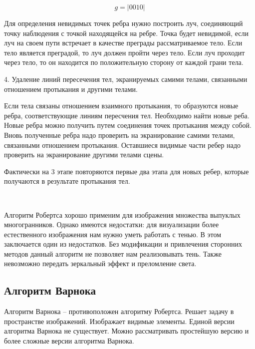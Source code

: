 \begin{equation}
	g = |0010|
	\label{eq:ref3}
\end{equation}

Для определения невидимых точек ребра нужно построить луч, соединяющий точку наблюдения с точкой находящейся на ребре.
Точка будет невидимой, если луч на своем пути встречает в качестве преграды рассматриваемое тело.
Если тело является преградой, то луч должен пройти через тело.
Если луч проходит через тело, то он находится по положительную сторону от каждой грани тела.

4. Удаление линий пересечения тел, экранируемых самими телами, связанными отношением протыкания и другими телами.

Если тела связаны отношением взаимного протыкания, то образуются новые ребра, соответствующие линиям пересчения тел. Необходимо найти новые реба. Новые ребра можно получить путем соединения точек протыкания между собой. Вновь полученные ребра надо проверить на экранирование самими телами, связанными отношением протыкания. Оставшиеся видимые части ребер надо проверить на экранирование другими телами сцены.

Фактически на 3 этапе повторяются первые два этапа для новых ребер, которые получаются в результате протыкания тел.

~

Алгоритм Робертса хорошо применим для изображения множества выпуклых многогранников. Однако имеются недостатки: для визуализации более естественного изображения нам нужно уметь работать с тенью. В этом заключается один из недостатков. Без модификации и привлечения сторонних методов данный алгоритм не позволяет нам реализовывать тень. Также невозможно передать зеркальный эффект и преломление света.

\subsection{Алгоритм Варнока}

Алгоритм Варнока -- противоположен алгоритму Робертса. Решает задачу в пространстве изображений. Изображает видимые элементы. Единой версии алгоритма Варнока не существует. Можно рассматривать простейшую версию и более сложные версии алгоритма Варнока.

\begin{figure}[ht!]
\end{figure}


